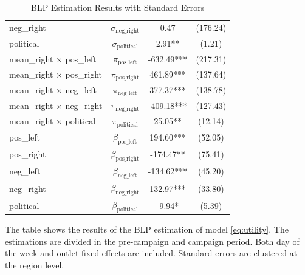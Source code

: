 \documentclass[12pt]{article}
\begin{document}
\begin{table}[ht]
\begin{threeparttable}
\begin{tabular}{lccc}
		neg\_right & $ \sigma_{\text{neg\_right}} $ & 0.47 & (176.24) \\
		political & $ \sigma_{\text{political}} $ & 2.91** & (1.21) \\
		\hline
		mean\_right $\times $ pos\_left & $ \pi_{\text{pos\_left}} $ & -632.49*** & (217.31) \\
		mean\_right $\times $ pos\_right & $ \pi_{\text{pos\_right}} $ & 461.89*** & (137.64) \\
		mean\_right $\times $ neg\_left & $ \pi_{\text{neg\_left}} $ & 377.37*** & (138.78) \\
		mean\_right $\times $ neg\_right & $ \pi_{\text{neg\_right}} $ & -409.18*** & (127.43) \\
		mean\_right $\times $ political & $ \pi_{\text{political}} $ & 25.05** & (12.14) \\
		\hline
		pos\_left & $ \beta_{\text{pos\_left}} $ & 194.60*** & (52.05) \\
		pos\_right & $ \beta_{\text{pos\_right}} $ & -174.47** & (75.41) \\
		neg\_left & $ \beta_{\text{neg\_left}} $ & -134.62*** & (45.20) \\
		neg\_right & $ \beta_{\text{neg\_right}} $ & 132.97*** & (33.80) \\
		political & $ \beta_{\text{political}} $ & -9.94* & (5.39) \\
		\hline
		\hline
	\end{tabular}
	\caption{BLP Estimation Results with Standard Errors 				\label{table:results_blp}}
\begin{tablenotes}
\small
\item The table shows the results of the BLP estimation of model \ref{eq:utility}. The estimations are divided in the pre-campaign and campaign period. Both day of the week and outlet fixed effects are included. Standard errors are clustered at the region level. 
\end{tablenotes}

		\end{threeparttable}

\end{table}
\end{document}
